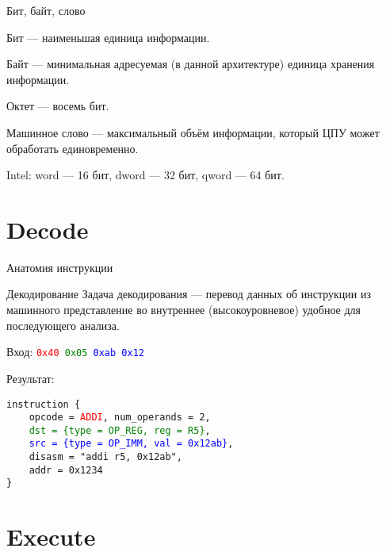 \begin{frame}{Бит, байт, слово}

Бит \pause --- наименьшая единица информации.

\pause\bigskip

Байт \pause --- минимальная адресуемая (в данной архитектуре) единица хранения
информации.

\pause\bigskip

Октет --- восемь бит.

\pause\bigskip

Машинное слово \pause --- максимальный объём информации, который ЦПУ может
обработать единовременно.

\pause\bigskip

Intel: word — 16 бит, dword — 32 бит, qword — 64 бит.

\end{frame}

\section{Decode}

\begin{frame}{Анатомия инструкции}
\centering
{}
\end{frame}

\begin{frame}[fragile]{Декодирование}
Задача декодирования --- перевод данных об инструкции из машинного представление
во внутреннее (высокоуровневое) удобное для последующего анализа.

\pause

Вход: \texttt{\textcolor{red}{0x40} \textcolor{green}{0x05} \textcolor{blue}{0xab 0x12}}

Результат:

\texttt{instruction \{ \\
~~~~opcode = \textcolor{red}{ADDI}, num\_operands = 2, \\
~~~~\textcolor{green}{dst = \{type = OP\_REG, reg = R5\}}, \\
~~~~\textcolor{blue}{src = \{type = OP\_IMM, val = 0x12ab\}}, \\
~~~~disasm = "addi r5, 0x12ab", \\
~~~~addr = 0x1234 \\
\}}

\end{frame}

\section{Execute}

